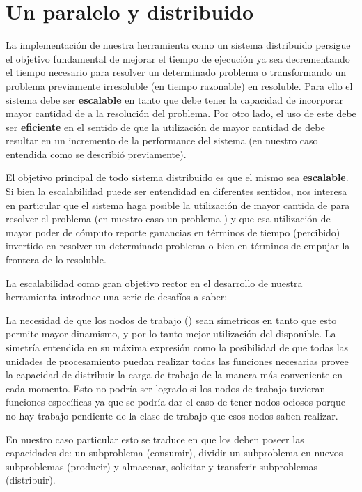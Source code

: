 

\chapter{Un \ssolver paralelo y distribuido }
\label{ssolver-pardist}

La implementación de nuestra herramienta como un sistema distribuido persigue
el objetivo fundamental de mejorar el tiempo de ejecución ya sea decrementando
el tiempo necesario para resolver un determinado problema o transformando un
problema previamente irresoluble (en tiempo razonable) en resoluble. Para ello
el sistema debe ser \textbf{escalable} en tanto que debe tener la capacidad de
incorporar mayor cantidad de \hard a la resolución del problema. Por otro
lado, el uso de este \hard debe ser \textbf{eficiente} en el sentido de que la
utilización de mayor cantidad de \hard debe resultar en un incremento de la
performance del sistema (en nuestro caso entendida como se describió
previamente).

El objetivo principal de todo sistema distribuido es que el mismo sea
\textbf{escalable}. Si bien la escalabilidad puede ser entendidad en
diferentes sentidos, nos interesa en particular que el sistema haga posible la
utilización de mayor cantida de \hard para resolver el problema (en nuestro
caso un problema \sat) y que esa utilización de mayor poder de cómputo reporte
ganancias en términos de tiempo (percibido) invertido en resolver un
determinado problema o bien en términos de empujar la frontera de lo
resoluble.

La escalabilidad como gran objetivo rector en el desarrollo de nuestra
herramienta introduce una serie de desafíos a saber:

La necesidad de que los nodos de trabajo (\ws) sean símetricos en
tanto que esto permite mayor dinamismo, y por lo tanto mejor utilización del
\hard disponible. La simetría entendida en su máxima expresión como la
posibilidad de que todas las unidades de procesamiento puedan realizar todas
las funciones necesarias provee la capacidad de distribuir la carga de trabajo
de la manera más conveniente en cada momento. Esto no podría ser logrado si
los nodos de trabajo tuvieran funciones específicas ya que se podría dar el
caso de tener nodos ociosos porque no hay trabajo pendiente de la clase de
trabajo que esos nodos saben realizar.

En nuestro caso particular esto se traduce en que los \ws deben poseer las
capacidades de: \solvear {} un
subproblema (consumir), dividir un subproblema en nuevos subproblemas
(producir) y almacenar, solicitar y transferir subproblemas (distribuir).

